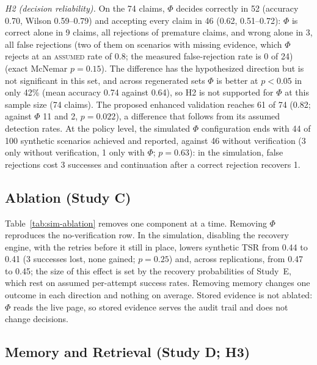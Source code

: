 \emph{H2 (decision reliability).} On the 74 claims, $\Phi$ decides correctly in 52 (accuracy 0.70, Wilson 0.59--0.79) and accepting every claim in 46 (0.62, 0.51--0.72): $\Phi$ is correct alone in 9 claims, all rejections of premature claims, and wrong alone in 3, all false rejections (two of them on scenarios with missing evidence, which $\Phi$ rejects at an \textsc{assumed} rate of 0.8; the measured false-rejection rate is 0 of 24) (exact McNemar $p=0.15$). The difference has the hypothesized direction but is not significant in this set, and across regenerated sets $\Phi$ is better at $p<0.05$ in only 42\% (mean accuracy 0.74 against 0.64), so H2 is not supported for $\Phi$ at this sample size (74 claims). The proposed enhanced validation reaches 61 of 74 (0.82; against $\Phi$ 11 and 2, $p=0.022$), a difference that follows from its assumed detection rates. At the policy level, the simulated $\Phi$ configuration ends with 44 of 100 synthetic scenarios achieved and reported, against 46 without verification (3 only without verification, 1 only with $\Phi$; $p=0.63$): in the simulation, false rejections cost 3 successes and continuation after a correct rejection recovers 1.

\subsection{Ablation (Study C)}



Table~\ref{tab:sim-ablation} removes one component at a time. Removing $\Phi$ reproduces the no-verification row. In the simulation, disabling the recovery engine, with the retries before it still in place, lowers synthetic TSR from 0.44 to 0.41 (3 successes lost, none gained; $p=0.25$) and, across replications, from 0.47 to 0.45; the size of this effect is set by the recovery probabilities of Study~E, which rest on assumed per-attempt success rates. Removing memory changes one outcome in each direction and nothing on average. Stored evidence is not ablated: $\Phi$ reads the live page, so stored evidence serves the audit trail and does not change decisions.

\subsection{Memory and Retrieval (Study D; H3)}



